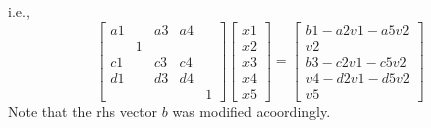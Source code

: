 \documentclass{report}
\begin{document}
i.e.,
$$
\left[ \begin{array}{lllll}
         a1 &    & a3 & a4 &   \\
            &  1 &    &    &   \\
         c1 &    & c3 & c4 &   \\
         d1 &    & d3 & d4 &   \\
            &    &    &    &  1
\end{array} \right]
\left[ \begin{array}{l}
         x1\\
         x2\\
         x3\\
         x4\\
         x5
\end{array} \right]
=
\left[ \begin{array}{l}
         b1-a2v1-a5v2\\
         v2\\
         b3-c2v1-c5v2\\
         v4-d2v1-d5v2\\
         v5
\end{array} \right]
$$
Note that the rhs vector $b$ was modified acoordingly.
\end{document}
